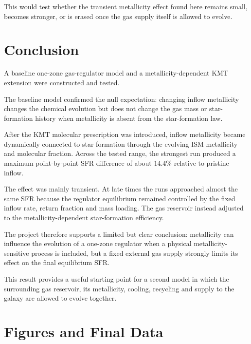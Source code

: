\documentclass[10pt,a4paper]{article}
\begin{document}
This would test whether the transient metallicity effect found here remains small, becomes stronger, or is erased once the gas supply itself is allowed to evolve.

\section{Conclusion}

A baseline one-zone gas-regulator model and a metallicity-dependent KMT extension were constructed and tested.

The baseline model confirmed the null expectation: changing inflow metallicity changes the chemical evolution but does not change the gas mass or star-formation history when metallicity is absent from the star-formation law.

After the KMT molecular prescription was introduced, inflow metallicity became dynamically connected to star formation through the evolving ISM metallicity and molecular fraction. Across the tested range, the strongest run produced a maximum point-by-point SFR difference of about \(14.4\%\) relative to pristine inflow.

The effect was mainly transient. At late times the runs approached almost the same SFR because the regulator equilibrium remained controlled by the fixed inflow rate, return fraction and mass loading. The gas reservoir instead adjusted to the metallicity-dependent star-formation efficiency.

The project therefore supports a limited but clear conclusion: metallicity can influence the evolution of a one-zone regulator when a physical metallicity-sensitive process is included, but a fixed external gas supply strongly limits its effect on the final equilibrium SFR.

This result provides a useful starting point for a second model in which the surrounding gas reservoir, its metallicity, cooling, recycling and supply to the galaxy are allowed to evolve together.


\section*{Figures and Final Data}
\captionsetup{font=small}
\end{document}
